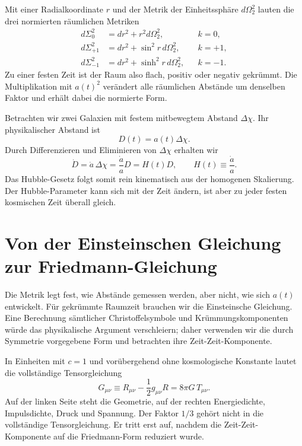 Mit einer Radialkoordinate \(r\) und der Metrik der Einheitssphäre \(d\Omega_2^2\) lauten die drei normierten räumlichen Metriken
\begin{align}
d\Sigma_0^2 &= dr^2+r^2d\Omega_2^2,
&& k=0,
\label{eq:c04-flat-space}\\
d\Sigma_{+1}^2 &= dr^2+\sin^2 r\,d\Omega_2^2,
&& k=+1,
\label{eq:c04-spherical-space}\\
d\Sigma_{-1}^2 &= dr^2+\sinh^2 r\,d\Omega_2^2,
&& k=-1.
\label{eq:c04-hyperbolic-space}
\end{align}
Zu einer festen Zeit ist der Raum also flach, positiv oder negativ gekrümmt. Die Multiplikation mit \(a(t)^2\) verändert alle räumlichen Abstände um denselben Faktor und erhält dabei die normierte Form.

Betrachten wir zwei Galaxien mit festem mitbewegtem Abstand \(\Delta\chi\). Ihr physikalischer Abstand ist
\begin{equation}
D(t)=a(t)\Delta\chi.
\end{equation}
Durch Differenzieren und Eliminieren von \(\Delta\chi\) erhalten wir
\begin{equation}
\dot D=\dot a\,\Delta\chi
      =\frac{\dot a}{a}D
      =H(t)D,
\qquad
H(t)\equiv\frac{\dot a}{a}.
\label{eq:c04-hubble-law}
\end{equation}
Das Hubble-Gesetz folgt somit rein kinematisch aus der homogenen Skalierung. Der Hubble-Parameter kann sich mit der Zeit ändern, ist aber zu jeder festen kosmischen Zeit überall gleich.

\section{Von der Einsteinschen Gleichung zur Friedmann-Gleichung}

Die Metrik legt fest, wie Abstände gemessen werden, aber nicht, wie sich \(a(t)\) entwickelt. Für gekrümmte Raumzeit brauchen wir die Einsteinsche Gleichung. Eine Berechnung sämtlicher Christoffelsymbole und Krümmungskomponenten würde das physikalische Argument verschleiern; daher verwenden wir die durch Symmetrie vorgegebene Form und betrachten ihre Zeit-Zeit-Komponente.

In Einheiten mit \(c=1\) und vorübergehend ohne kosmologische Konstante lautet die vollständige Tensorgleichung
\begin{equation}
G_{\mu\nu}
\equiv
R_{\mu\nu}-\frac12 g_{\mu\nu}R
=8\pi G\,T_{\mu\nu}.
\label{eq:c04-einstein}
\end{equation}
Auf der linken Seite steht die Geometrie, auf der rechten Energiedichte, Impulsdichte, Druck und Spannung. Der Faktor \(1/3\) gehört nicht in die vollständige Tensorgleichung. Er tritt erst auf, nachdem die Zeit-Zeit-Komponente auf die Friedmann-Form reduziert wurde.

